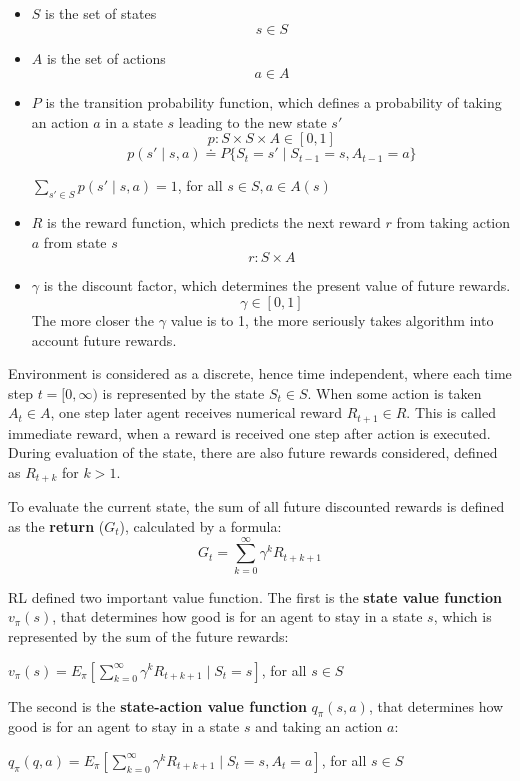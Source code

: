 \documentclass[fleqn,10pt]{olplainarticle}
\begin{document}
\begin{itemize}
\item $S$ is the set of states
$$s \in S$$
\item $A$ is the set of actions
$$a \in A$$
\item $P$ is the transition probability function, which defines a probability of taking an action $a$ in a state $s$ leading to the new state $s'$
$$p : S \times S \times A \in [0,1]$$
$$p(s' \mid s,a) \doteq P\{S_t = s'\mid S_{t-1} = s, A_{t-1} = a\} $$
\begin{center}
$\sum_{s' \in S} p(s' \mid s,a) = 1$, for all $s \in S, a \in A(s)$
\end{center}
\item $R$ is the reward function, which predicts the next reward $r$ from taking action $a$ from state $s$
$$r : S \times A$$
\item $\gamma$ is the discount factor, which determines the present value of future rewards.
$$\gamma \in [0,1]$$
The more closer the $\gamma$ value is to 1, the more seriously takes algorithm into account future rewards.
\end{itemize}

Environment is considered as a discrete, hence time independent, where each time step $t = [0,  \infty)$ is represented by the state $S_t \in S$. When some action is taken $A_t \in A$, one step later agent receives numerical reward $R_{t+1} \in R$. This is called immediate reward, when a reward is received one step after action is executed. During evaluation of the state, there are also future rewards considered, defined as $R_{t+k}$ for $k > 1$.

\vskip10pt

To evaluate the current state, the sum of all future discounted rewards is defined as the \textbf{return} ($G_t$), calculated by a formula:
$$G_t = \sum_{k=0}^{\infty} \gamma^k R_{t+k+1}$$

RL defined two important value function. The first is the \textbf{state value function} $v_{\pi}(s)$, that determines how good is for an agent to stay in a state $s$, which is represented by the sum of the future rewards:
\begin{center}
$v_{\pi}(s) = E_{\pi}[\sum_{k=0}^{\infty} \gamma^k R_{t+k+1} \mid S_{t}=s]$, for all $s \in S$
\end{center}

The second is the \textbf{state-action value function} $q_{\pi}(s,a)$, that determines how good is for an agent to stay in a state $s$ and taking an action $a$:
\begin{center}
$q_{\pi}(q,a) = E_{\pi}[\sum_{k=0}^{\infty} \gamma^k R_{t+k+1} \mid S_{t}=s, A_{t}=a]$, for all $s \in S$
\end{center}
\end{document}
